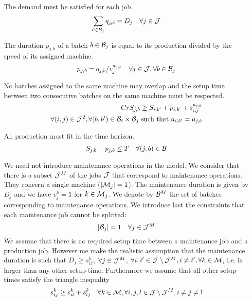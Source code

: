 \noindent The demand must be satisfied for each job.
\begin{eqnarray}
\sum_{b\in{\cal B}_j} q_{j,b} = D_j\quad\forall j\in{\cal
  J}\label{ct:4}
\end{eqnarray}

\noindent The duration $p_{j,b}$ of a batch $b\in {\cal B}_j$ is equal to 
its production divided by the speed of its assigned machine.
\begin{eqnarray}
p_{j,b}=q_{j,b}/v_{j}^{a_{j,b}}\quad\forall
j\in{\cal J},\forall b\in{\cal B}_j\label{ct:5}
\end{eqnarray}


\noindent No batches assigned to the same machine may overlap and the
setup time between two consecutive batches on the same machine must be
respected.
\begin{eqnarray}{Cr}
S_{j,b}\geq S_{i,b'} + p_{i,b'}
+ s_{i,j}^{a_{j,b}} & \nonumber
\\ \forall (i,j) \in{\cal
  J}^2,\forall (b,b')\in{\cal B}_i\times{\cal B}_j \mbox{ such that } 
a_{i,b'}=a_{j,b}\label{ct:6}
\end{eqnarray}

\noindent All production must fit in the time horizon.
\begin{eqnarray}
S_{j,b}+p_{j,b}\leq T \quad \forall (j,b)\in{\cal B}\label{ct:7}
\end{eqnarray}

We need not introduce maintenance operations in the model. We consider
that there is a subset ${\cal J}^M$ of the jobs ${\cal J}$ that
correspond to maintenance operations. They concern a single machine
($|{\cal M}_j|=1$). The maintenance duration is given by $D_j$ and we
have $v^k_j=1$ for $k\in{\cal M}_j$. We denote by ${\cal B}^M$ the set
of batches corresponding to maintenance operations. We introduce last
the constraints that each maintenance job cannot be splitted:
\begin{eqnarray}
|{\cal B}_j|=1\quad\forall j\in{\cal J}^M\label{ct:8}
\end{eqnarray}
We assume that there is no required setup time between a maintenance
job and a production job. However me make the realistic assumption
that the maintenance duration is such that $D_j\geq s_{ii'}^k$, $\forall
j\in{\cal J}^M$, $\forall i,i'\in {\cal J}\setminus{\cal J}^M, i\neq
i', \forall k \in {\cal M}$, i.e. is larger than any other setup time. 
Furthermore we assume that all other setup times satisfy the triangle inequality
\begin{eqnarray}
s_{ij}^k\geq s_{il}^k+s_{lj}^k\quad\forall k\in{\cal M},\forall
i,j,l\in{\cal J}\setminus{\cal J}^M,i\neq j\neq l\nonumber
\end{eqnarray}

